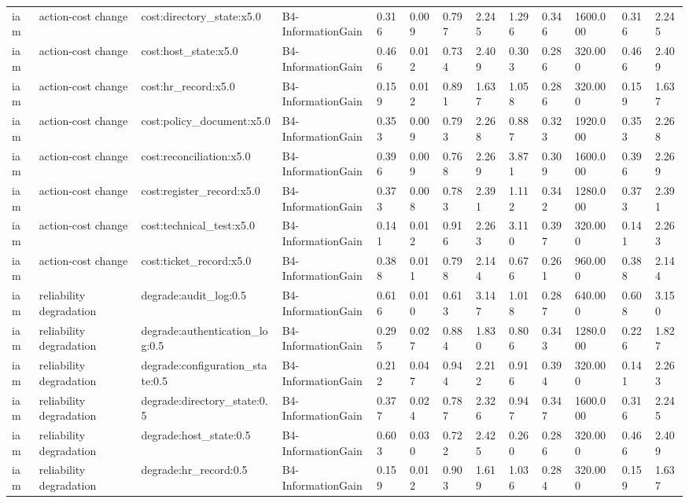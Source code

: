 \begin{table}[!ht]
{\begin{tabular}{lllllllllllll}
iam & action-cost change & cost:directory\_state:x5.0 & B4-InformationGain & 0.316 & 0.009 & 0.797 & 2.245 & 1.296 & 0.346 & 1600.000 & 0.316 & 2.245 \\
iam & action-cost change & cost:host\_state:x5.0 & B4-InformationGain & 0.466 & 0.012 & 0.734 & 2.409 & 0.303 & 0.286 & 320.000 & 0.466 & 2.409 \\
iam & action-cost change & cost:hr\_record:x5.0 & B4-InformationGain & 0.159 & 0.012 & 0.891 & 1.637 & 1.058 & 0.286 & 320.000 & 0.159 & 1.637 \\
iam & action-cost change & cost:policy\_document:x5.0 & B4-InformationGain & 0.353 & 0.009 & 0.793 & 2.268 & 0.887 & 0.323 & 1920.000 & 0.353 & 2.268 \\
iam & action-cost change & cost:reconciliation:x5.0 & B4-InformationGain & 0.396 & 0.009 & 0.768 & 2.269 & 3.871 & 0.309 & 1600.000 & 0.396 & 2.269 \\
iam & action-cost change & cost:register\_record:x5.0 & B4-InformationGain & 0.373 & 0.008 & 0.783 & 2.391 & 1.112 & 0.342 & 1280.000 & 0.373 & 2.391 \\
iam & action-cost change & cost:technical\_test:x5.0 & B4-InformationGain & 0.141 & 0.012 & 0.916 & 2.263 & 3.110 & 0.397 & 320.000 & 0.141 & 2.263 \\
iam & action-cost change & cost:ticket\_record:x5.0 & B4-InformationGain & 0.388 & 0.011 & 0.798 & 2.144 & 0.676 & 0.261 & 960.000 & 0.388 & 2.144 \\
iam & reliability degradation & degrade:audit\_log:0.5 & B4-InformationGain & 0.616 & 0.010 & 0.613 & 3.147 & 1.018 & 0.287 & 640.000 & 0.608 & 3.150 \\
iam & reliability degradation & degrade:authentication\_log:0.5 & B4-InformationGain & 0.295 & 0.027 & 0.884 & 1.830 & 0.806 & 0.343 & 1280.000 & 0.226 & 1.827 \\
iam & reliability degradation & degrade:configuration\_state:0.5 & B4-InformationGain & 0.212 & 0.047 & 0.944 & 2.212 & 0.916 & 0.394 & 320.000 & 0.141 & 2.263 \\
iam & reliability degradation & degrade:directory\_state:0.5 & B4-InformationGain & 0.377 & 0.024 & 0.787 & 2.326 & 0.947 & 0.347 & 1600.000 & 0.316 & 2.245 \\
iam & reliability degradation & degrade:host\_state:0.5 & B4-InformationGain & 0.603 & 0.030 & 0.722 & 2.425 & 0.260 & 0.286 & 320.000 & 0.466 & 2.409 \\
iam & reliability degradation & degrade:hr\_record:0.5 & B4-InformationGain & 0.159 & 0.012 & 0.903 & 1.619 & 1.036 & 0.284 & 320.000 & 0.159 & 1.637 \\

\end{tabular}}
\end{table}
